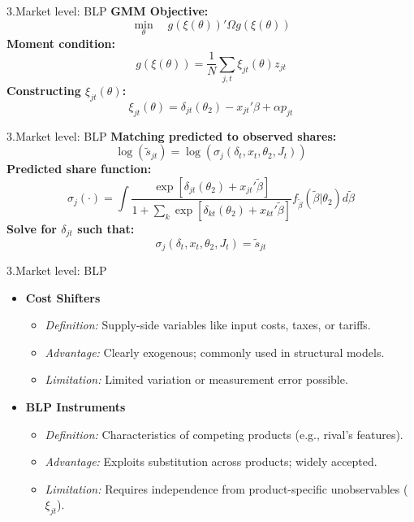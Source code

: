 \documentclass[aspectratio=169]{beamer}  %
\begin{document}
\begin{frame}{3.Market level: BLP}
    \textbf{GMM Objective:}
    \begin{equation}
        \min_{\theta} \quad g(\xi(\theta))' \Omega g(\xi(\theta)) \tag{3.1}
    \end{equation}
    \textbf{Moment condition:}
    \begin{equation}
        g(\xi(\theta)) = \frac{1}{N} \sum_{j,t} \xi_{jt}(\theta) z_{jt} \tag{3.2}
    \end{equation}
    \textbf{Constructing \( \xi_{jt}(\theta) \):}
    \begin{equation}
        \xi_{jt}(\theta) = \delta_{jt}(\theta_2) - x_{jt}'\beta + \alpha p_{jt} \tag{3.3}
    \end{equation}
\end{frame}

\begin{frame}{3.Market level: BLP}
    \textbf{Matching predicted to observed shares:}
    \begin{equation}
        \log(\tilde{s}_{jt}) = \log(\sigma_j(\delta_t, x_t, \theta_2, J_t)) \tag{3.4}
    \end{equation}
    \textbf{Predicted share function:}
    \begin{equation}
        \sigma_j(\cdot) = \int \frac{\exp[\delta_{jt}(\theta_2) + x_{jt}'\tilde{\beta}]}{1 + \sum_k \exp[\delta_{kt}(\theta_2) + x_{kt}'\tilde{\beta}]} f_{\tilde{\beta}}(\tilde{\beta}|\theta_2) d\tilde{\beta} \tag{3.5}
    \end{equation}
    \textbf{Solve for \( \delta_{jt} \) such that:}
    \[ \sigma_j(\delta_t, x_t, \theta_2, J_t) = \tilde{s}_{jt} \]
\end{frame}

\begin{frame}{3.Market level: BLP}
\begin{itemize}
    \item \textbf{Cost Shifters}
    \begin{itemize}
        \item \textit{Definition:} Supply-side variables like input costs, taxes, or tariffs.
        \item \textit{Advantage:} Clearly exogenous; commonly used in structural models.
        \item \textit{Limitation:} Limited variation or measurement error possible.
    \end{itemize}
    
    \item \textbf{BLP Instruments}
    \begin{itemize}
        \item \textit{Definition:} Characteristics of competing products (e.g., rival’s features).
        \item \textit{Advantage:} Exploits substitution across products; widely accepted.
        \item \textit{Limitation:} Requires independence from product-specific unobservables ($\xi_{jt}$).
    \end{itemize}
\end{itemize}
\end{frame}
\end{document}
